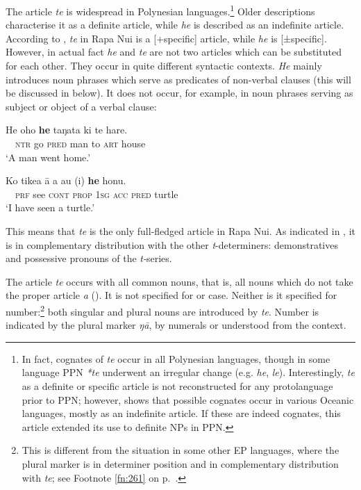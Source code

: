 The article \textit{te} is widespread in Polynesian languages.\footnote{\label{fn:249}In fact, cognates of \textit{te} occur in all Polynesian languages, though in some language PPN \textit{*te} underwent an irregular change (e.g.  \textit{he},  \textit{le}). Interestingly, \textit{te} as a definite or specific article is not reconstructed for any protolanguage prior to PPN; however, \citet{Clark2015} shows that possible cognates occur in various Oceanic languages, mostly as an indefinite article. If these are indeed cognates, this article extended its use to definite NPs in PPN.} Older descriptions characterise it as a definite article, while \textit{he} is described as an indefinite article. According to \citet[11]{DuFeu1996}, \textit{te} in Rapa Nui is a [+specific] article, while \textit{he} is [±specific]. However, in actual fact \textit{he} and \textit{te} are not two articles which can be substituted for each other. They occur in quite different syntactic contexts. \textit{He} mainly introduces noun phrases which serve as predicates of non-verbal clauses (this will be discussed in  below). It does not occur, for example, in noun phrases serving as subject or object of a verbal clause:

\ea\label{ex:5.26}
\gll *He oho \textbf{he} taŋata ki te hare. \\
\textsc{~~ntr} go \textsc{pred} man to \textsc{art} house \\

\glt 
‘A man went home.’
\z

\ea\label{ex:5.27}
\gll *Ko tike{\ꞌ}a {\ꞌ}ā a au (i) \textbf{he} honu. \\
\textsc{~~prf} see \textsc{cont} \textsc{prop} \textsc{1sg} \textsc{acc} \textsc{pred} turtle \\

\glt
‘I have seen a turtle.’
\z

This means that \textit{te} is the only full-fledged article in Rapa Nui. As indicated in , it is in complementary distribution with the other \textit{t}{}-determiners: demonstratives and possessive pronouns of the \textit{t-}series. 

The article \textit{te} occurs with all common nouns, that is, all nouns which do not take the proper article \textit{a} (). It is not specified for  or case. Neither is it specified for number:\footnote{\label{fn:250}This is different from the situation in some other EP languages, where the plural marker is in determiner position and in complementary distribution with \textit{te}; see Footnote \ref{fn:261} on p.~\pageref{fn:261}.} both singular and plural nouns are introduced by \textit{te}. Number is indicated by the plural marker \textit{ŋā}, by numerals or understood from the context.

